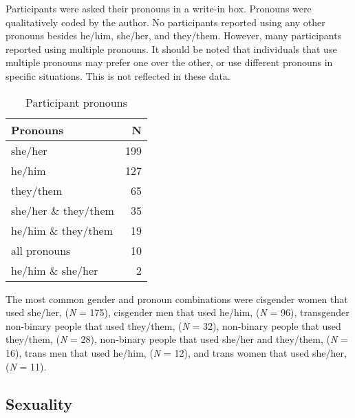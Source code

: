 \documentclass[12pt,twoside]{reedthesis}
\begin{document}
Participants were asked their pronouns in a write-in box. Pronouns were qualitatively coded by the author. No participants reported using any other pronouns besides he/him, she/her, and they/them. However, many participants reported using multiple pronouns. It should be noted that individuals that use multiple pronouns may prefer one over the other, or use different pronouns in specific situations. This is not reflected in these data.
\begin{longtable}[t]{lr}
\caption{\label{tab:cockandballs}Participant pronouns}\\
\toprule
Pronouns & N\\
\midrule
she/her & 199\\
he/him & 127\\
they/them & 65\\
she/her \& they/them & 35\\
he/him \& they/them & 19\\
\addlinespace
all pronouns & 10\\
he/him \& she/her & 2\\
\bottomrule
\end{longtable}
The most common gender and pronoun combinations were cisgender women that used she/her, (\emph{N} = 175), cisgender men that used he/him, (\emph{N} = 96), transgender non-binary people that used they/them, (\emph{N} = 32), non-binary people that used they/them, (\emph{N} = 28), non-binary people that used she/her and they/them, (\emph{N} = 16), trans men that used he/him, (\emph{N} = 12), and trans women that used she/her, (\emph{N} = 11).

\hypertarget{sexuality}{%
\subsection{Sexuality}\label{sexuality}}
\end{document}
